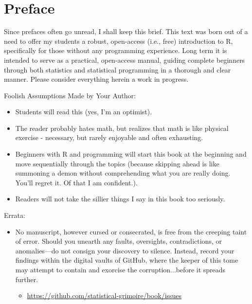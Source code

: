 \chapter*{Preface}
Since prefaces often go unread, I shall keep this brief. This text was born out of a need to offer my students a robust, open-access (i.e., free) introduction to R, specifically for those without any programming experience. Long term it is intended to serve as a practical, open-access manual, guiding complete beginners through both statistics and statistical programming in a thorough and clear manner. Please consider everything herein a work in progress.

\vspace{2em}

{
\headingfont \Large
\noindent Foolish Assumptions Made by Your Author:
\normalsize\normalfont
\begin{itemize}
    \item Students will read this (yes, I'm an optimist).
    \item The reader probably hates math, but realizes that math is like physical exercise - necessary, but rarely enjoyable and often exhausting.
    \item Beginners with R and programming will start this book at the beginning and move sequentially through the topics (because skipping ahead is like summoning a demon without comprehending what you are really doing. You’ll regret it. Of that I am confident.).
    \item Readers will not take the sillier things I say in this book too seriously.
\end{itemize}
}

\vspace{2em}

{
\headingfont \Large
\noindent Errata:
\normalsize\normalfont
\begin{itemize}
\item No manuscript, however cursed or consecrated, is free from the creeping taint of error. Should you unearth any faults, oversights, contradictions, or anomalies—do not consign your discovery to silence. Instead, record your findings within the digital vaults of GitHub, where the keeper of this tome may attempt to contain and exorcise the corruption...before it spreads further.
    \begin{itemize}
        \item \url{https://github.com/statistical-grimoire/book/issues}
    \end{itemize}
\end{itemize}
}


